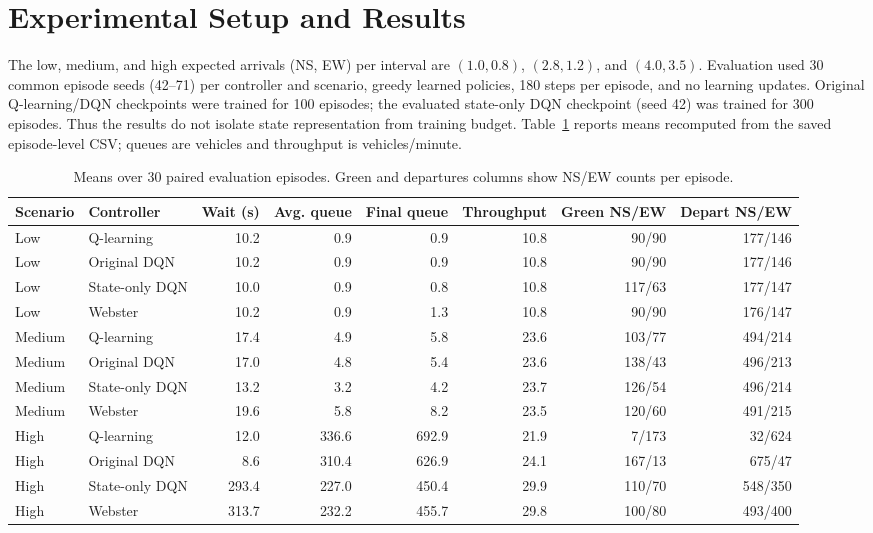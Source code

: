 \documentclass[conference]{IEEEtran}
\begin{document}
\section{Experimental Setup and Results}
The low, medium, and high expected arrivals (NS, EW) per interval are $(1.0,0.8)$, $(2.8,1.2)$, and $(4.0,3.5)$. Evaluation used 30 common episode seeds (42--71) per controller and scenario, greedy learned policies, 180 steps per episode, and no learning updates. Original Q-learning/DQN checkpoints were trained for 100 episodes; the evaluated state-only DQN checkpoint (seed 42) was trained for 300 episodes. Thus the results do not isolate state representation from training budget. Table~\ref{tab:results} reports means recomputed from the saved episode-level CSV; queues are vehicles and throughput is vehicles/minute.

\begin{table}[!t]
\centering
\caption{Means over 30 paired evaluation episodes. Green and departures columns show NS/EW counts per episode.}
\label{tab:results}
\scriptsize
\setlength{\tabcolsep}{5pt}
\begin{tabular}{llrrrrrr}
\toprule
Scenario & Controller & Wait (s) & Avg. queue & Final queue & Throughput & Green NS/EW & Depart NS/EW\\
\midrule
Low & Q-learning & 10.2 & 0.9 & 0.9 & 10.8 & 90/90 & 177/146\\
Low & Original DQN & 10.2 & 0.9 & 0.9 & 10.8 & 90/90 & 177/146\\
Low & State-only DQN & 10.0 & 0.9 & 0.8 & 10.8 & 117/63 & 177/147\\
Low & Webster & 10.2 & 0.9 & 1.3 & 10.8 & 90/90 & 176/147\\
\midrule
Medium & Q-learning & 17.4 & 4.9 & 5.8 & 23.6 & 103/77 & 494/214\\
Medium & Original DQN & 17.0 & 4.8 & 5.4 & 23.6 & 138/43 & 496/213\\
Medium & State-only DQN & 13.2 & 3.2 & 4.2 & 23.7 & 126/54 & 496/214\\
Medium & Webster & 19.6 & 5.8 & 8.2 & 23.5 & 120/60 & 491/215\\
\midrule
High & Q-learning & 12.0 & 336.6 & 692.9 & 21.9 & 7/173 & 32/624\\
High & Original DQN & 8.6 & 310.4 & 626.9 & 24.1 & 167/13 & 675/47\\
High & State-only DQN & 293.4 & 227.0 & 450.4 & 29.9 & 110/70 & 548/350\\
High & Webster & 313.7 & 232.2 & 455.7 & 29.8 & 100/80 & 493/400\\
\bottomrule
\end{tabular}
\end{table}
\end{document}
